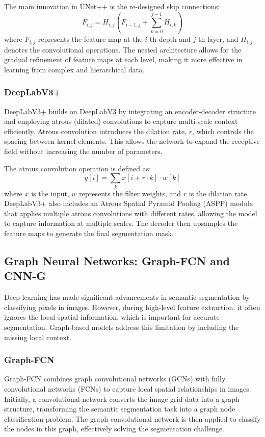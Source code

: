 The main innovation in UNet++ is the re-designed skip connections:
\[
F_{i,j} = H_{i,j} \left( F_{i-1,j} + \sum_{k=0}^{j-1} H_{i,k} \right)
\]
where $F_{i,j}$ represents the feature map at the $i$-th depth and $j$-th layer, and $H_{i,j}$ denotes the convolutional operations. The nested architecture allows for the gradual refinement of feature maps at each level, making it more effective in learning from complex and hierarchical data.

\subsubsection{DeepLabV3+}

DeepLabV3+ \cite{chen2018deeplabv3+} builds on DeepLabV3 by integrating an encoder-decoder structure and employing atrous (dilated) convolutions to capture multi-scale context efficiently. Atrous convolution introduces the dilation rate, $r$, which controls the spacing between kernel elements. This allows the network to expand the receptive field without increasing the number of parameters.

The atrous convolution operation is defined as:
\[
y[i] = \sum_k x[i + r \cdot k] \cdot w[k]
\]
where $x$ is the input, $w$ represents the filter weights, and $r$ is the dilation rate. DeepLabV3+ also includes an Atrous Spatial Pyramid Pooling (ASPP) module that applies multiple atrous convolutions with different rates, allowing the model to capture information at multiple scales. The decoder then upsamples the feature maps to generate the final segmentation mask.

\subsection{Graph Neural Networks: Graph-FCN and CNN-G}

Deep learning has made significant advancements in semantic segmentation by classifying pixels in images. However, during high-level feature extraction, it often ignores the local spatial information, which is important for accurate segmentation. Graph-based models address this limitation by including the missing local context.

\subsubsection{Graph-FCN}

Graph-FCN combines graph convolutional networks (GCNs) with fully convolutional networks (FCNs) to capture local spatial relationships in images. Initially, a convolutional network converts the image grid data into a graph structure, transforming the semantic segmentation task into a graph node classification problem. The graph convolutional network is then applied to classify the nodes in this graph, effectively solving the segmentation challenge.

